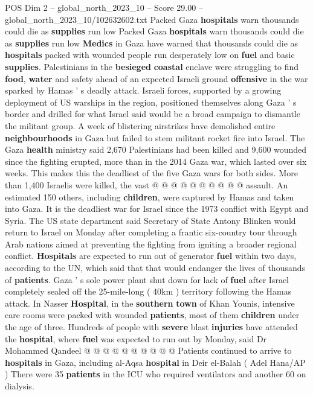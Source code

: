 \begin{textsample}{POS Dim 2 – global\_north\_2023\_10 – Score 29.00 – global\_north\_2023\_10/102632602.txt}  \label{ex:f2_pos_290}
Packed Gaza \textbf{hospitals} warn thousands could die as \textbf{supplies} run low Packed Gaza \textbf{hospitals} warn thousands could die as \textbf{supplies} run low \textbf{Medics} in Gaza have warned that thousands could die as \textbf{hospitals} packed with wounded people run desperately low on \textbf{fuel} and basic \textbf{supplies}.
Palestinians in the \textbf{besieged} \textbf{coastal} enclave were struggling to find \textbf{food}, \textbf{water} and safety ahead of an expected Israeli ground \textbf{offensive} in the war sparked by Hamas ' s deadly attack.
Israeli forces, supported by a growing deployment of US warships in the region, positioned themselves along Gaza ' s border and drilled for what Israel said would be a broad campaign to dismantle the militant group.
A week of blistering airstrikes have demolished entire \textbf{neighbourhoods} in Gaza but failed to stem militant rocket fire into Israel.
The Gaza \textbf{health} ministry said 2,670 Palestinians had been killed and 9,600 wounded since the fighting erupted, more than in the 2014 Gaza war, which lasted over six weeks.
This makes this the deadliest of the five Gaza wars for both sides.
More than 1,400 Israelis were killed, the vast @ @ @ @ @ @ @ @ @ @ assault.
An estimated 150 others, including \textbf{children}, were captured by Hamas and taken into Gaza.
It is the deadliest war for Israel since the 1973 conflict with Egypt and Syria.
The US state department said Secretary of State Antony Blinken would return to Israel on Monday after completing a frantic six-country tour through Arab nations aimed at preventing the fighting from igniting a broader regional conflict. \textbf{Hospitals} are expected to run out of generator \textbf{fuel} within two days, according to the UN, which said that that would endanger the lives of thousands of \textbf{patients}.
Gaza ' s sole power plant shut down for lack of \textbf{fuel} after Israel completely sealed off the 25-mile-long ( 40km ) territory following the Hamas attack.
In Nasser \textbf{Hospital}, in the \textbf{southern} \textbf{town} of Khan Younis, intensive care rooms were packed with wounded \textbf{patients}, most of them \textbf{children} under the age of three.
Hundreds of people with \textbf{severe} blast \textbf{injuries} have attended the \textbf{hospital}, where \textbf{fuel} was expected to run out by Monday, said Dr Mohammed Qandeel @ @ @ @ @ @ @ @ @ @ Patients continued to arrive to \textbf{hospitals} in Gaza, including al-Aqsa \textbf{hospital} in Deir el-Balah ( Adel Hana/AP ) There were 35 \textbf{patients} in the ICU who required ventilators and another 60 on dialysis.

\end{textsample}
